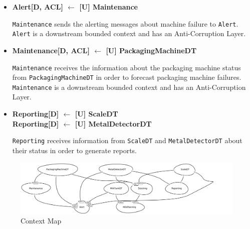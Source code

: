 \begin{itemize}
    \item \textbf{Alert[D, ACL] $\leftarrow$  [U] Maintenance}
    
    \texttt{Maintenance} sends the alerting messages about machine failure to \texttt{Alert}.
    \texttt{Alert} is a downstream bounded context and has an Anti-Corruption Layer.

	\item \textbf{Maintenance[D, ACL] $\leftarrow$  [U] PackagingMachineDT}
	
    \texttt{Maintenance} receives the information about the packaging machine status from \texttt{PackagingMachineDT} in order to forecast packaging machine failures.
    \texttt{Maintenance} is a downstream bounded context and has an Anti-Corruption Layer.

	\item \textbf{Reporting[D] $\leftarrow$  [U] ScaleDT \\
    Reporting[D] $\leftarrow$  [U] MetalDetectorDT }

    \texttt{Reporting} receives information from \texttt{ScaleDT} and \texttt{MetalDetectorDT} about their status in order to generate reports.
	

\end{itemize}

\begin{figure}[H]
    \centering
    \includegraphics[width=\textwidth]{img/context-map.png}
    \caption{Context Map}
    \label{img:context-map}
\end{figure}


